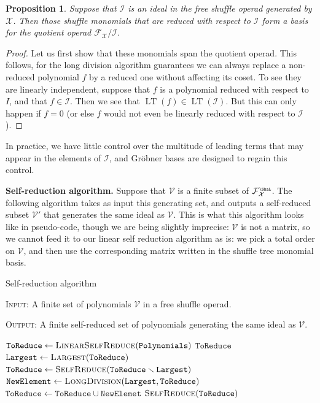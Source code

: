 \documentclass[fleqn, a4paper, twoside]{article}
\newcommand{\lead}[1]{\operatorname{LT}(#1)}
\newcommand{\Sha}{{\scaleobj{0.75}{\ShaL}}}
\newcommand{\0}{\langle 0\rangle}
\newcommand{\XX}{\mathcal{X}}
\newcommand{\FF}{\mathcal{F}}
\DeclareRobustCommand{\[}{\begin{equation}}%
\DeclareRobustCommand{\]}{\end{equation}}%
\theoremstyle{mytheorem}
\newtheorem{proposition}[theorem]{Proposition}
\theoremstyle{introthm}
\theoremstyle{mydefinition}
\theoremstyle{mydefinition2}
\theoremstyle{plain} %
\newcommand{\?}{\,?\,}
\theoremstyle{mytheorem}
\theoremstyle{plain} %
\begin{document}
\begin{proposition}
Suppose that $\mathcal I$ is an ideal in the free shuffle
operad generated by $\XX$. Then those shuffle monomials that
are reduced with respect to $\mathcal I$ form a basis
for the quotient operad $\FF_\XX / \mathcal I$.  
\end{proposition}

\begin{proof}
Let us first show that these monomials span the quotient operad.
This follows, for the long division algorithm guarantees
we can always replace a non-reduced polynomial $f$ by a reduced
one without affecting its coset. To see they are linearly
independent, suppose that $f$ is a polynomial reduced with
respect to $I$, and that $f\in \mathcal I$. Then we see that
$\lead{f} \in \lead{\mathcal I}$. But this can only happen if
$f=0$ (or else $f$ would not even be linearly reduced with respect
to $\mathcal I$). 
\end{proof}

In practice, we
have little control over the multitude of leading terms
that may appear in the elements of $\mathcal I$,
and Gr\"obner bases are designed to regain this control. 
 
 \bigskip
 
 \textbf{Self-reduction algorithm.} Suppose that
 $\mathcal V$ is a finite subset of $\FF_\XX^\Sha$. 
 The following
 algorithm takes as input this generating set,
 and outputs a self-reduced subset $\mathcal V'$
 that generates the same ideal as $\mathcal V$. 
 This is what this algorithm looks like in pseudo-code, 
 though we are being slightly imprecise: $\mathcal V$ is
 not a matrix, so we cannot feed it to our linear self
 reduction algorithm as is: we pick a total order on
 $\mathcal V$, and then use the corresponding matrix
 written in the shuffle tree monomial basis. 
 
 \begin{algorithm}
\caption{Self-reduction algorithm}\label{algo:self-reduce}
\textsc{Input:} A finite set of polynomials $\mathcal V$ in a
free shuffle operad.

\textsc{Output:} A finite self-reduced set of polynomials 
generating the same ideal as $\mathcal V$.
\begin{adjustwidth}{1 cm}{2 cm}
\begin{algorithmic}[1]
	\State $\texttt{ToReduce} \gets \textsc{LinearSelfReduce}(\texttt{Polynomials})$
 \Return $\texttt{ToReduce}$
\Else 
\State $\texttt{Largest} 
	\gets \textsc{Largest}(\texttt{ToReduce})$
\State $\texttt{ToReduce} \gets \textsc{SelfReduce}(\texttt{ToReduce}\smallsetminus \texttt{Largest} )$
\State $\texttt{NewElement} \gets \textsc{LongDivision}(\texttt{Largest} ,\texttt{ToReduce})$
\State $\texttt{ToReduce}\gets \texttt{ToReduce}\cup \texttt{NewElemet}$
\EndIf
\State \Return $\textsc{SelfReduce}(\texttt{ToReduce})$
\EndProcedure
\end{algorithmic}
\end{adjustwidth}

\end{algorithm}
\end{document}

